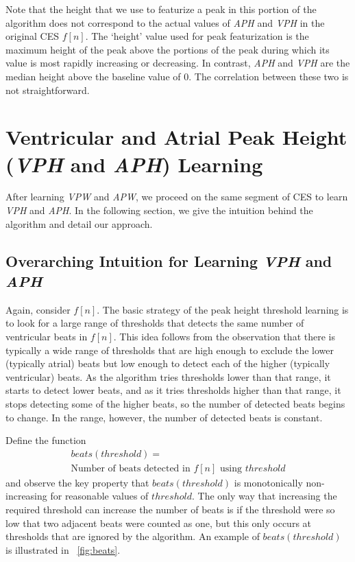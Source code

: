\documentclass[conference]{IEEEtran}
\newcommand{\APW}{\textit{APW}}
\newcommand{\VPW}{\textit{VPW}}
\newcommand{\APH}{\textit{APH}}
\newcommand{\VPH}{\textit{VPH}}
\begin{document}
Note that the height that we use to featurize a peak in
this portion of the algorithm does not correspond to the
actual values of \APH{} and \VPH{} in the original CES
$f[n]$. The `height' value used for peak
featurization is the maximum height of the peak
above the portions of the peak during which its
value is most rapidly increasing or decreasing. 
In contrast, \APH{} and \VPH{} are the median height above the baseline value of 0.
The correlation between these two is not straightforward. 

\section{Ventricular and Atrial Peak Height (\VPH{} and \APH{}) Learning}
After learning \VPW{} and \APW{}, we proceed on the
same segment of CES to learn \VPH{} and \APH{}. In
the following section, we give the intuition behind the
algorithm and detail our approach.

\subsection{Overarching Intuition for Learning \VPH{} and \APH{}}
Again, consider $f[n]$. The basic strategy of the peak
height threshold learning is to look for a large range of
thresholds that detects the same number of ventricular beats in
$f[n]$. This idea follows from the observation that there
is typically a wide range of thresholds that are high
enough to exclude the lower (typically atrial) beats but
low enough to detect each of the higher (typically
ventricular) beats. As the algorithm tries thresholds
lower than that range, it starts to detect lower beats, and
as it tries thresholds higher than that range, it stops
detecting some of the higher beats, so the number of
detected beats begins to change. In the range, however,
the number of detected beats is constant.

Define the function 
\begin{multline*}
	beats(threshold) = \\\text{Number of beats detected in } f[n] \text{ using } threshold
\end{multline*}
and observe the key property that $beats(threshold)$ is monotonically non-increasing for reasonable values of $threshold$. 
The only way that increasing the required threshold can increase the number of beats is if the threshold were so low that two adjacent beats were counted as one, but this only occurs at thresholds that are ignored by the algorithm.
An example of $beats(threshold)$ is illustrated in \figurename~\ref{fig:beats}.
\end{document}
